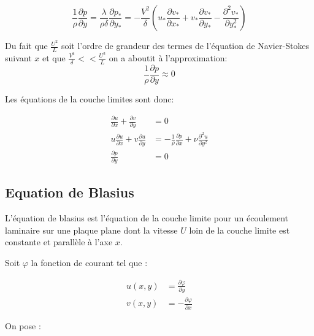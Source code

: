 \documentclass[french]{article}
\begin{document}
\begin{equation*}
	\frac{1}{\rho}
	\frac{\partial p}{\partial y} 
	= \frac{\lambda}{\rho\delta}
	\frac{\partial p_{*}}{\partial  y_{*}}
	= - \frac{V^{2}}{\delta}
	\left(
	u_{*}\frac{\partial v_{*}}{\partial x_{*}} + 
	v_{*}\frac{\partial v_{*}}{\partial y_{*}} 
	-\frac{\partial^{2} v_{*}}{\partial  y_{*}^{2}} 
	\right)
\end{equation*}

Du fait que $\frac{U^{2}}{L}$ soit l'ordre de grandeur des termes de l'équation de Navier-Stokes suivant $x$ et que $\frac{V^{2}}{\delta} << \frac{U^2}{L}$ on a aboutit à l'approximation:
\begin{equation*}
	\frac{1}{\rho}\frac{\partial p}{\partial y} \approx 0
\end{equation*}

Les équations de la couche limites sont donc:

\begin{align}	
	\frac{\partial u}{\partial x} 
	+
	\frac{\partial v}{\partial y} 
	&= 0 \\
	u\frac{\partial u}{\partial x} + 
	v\frac{\partial u}{\partial y} 
	&= - \frac{1}{\rho}
	\frac{\partial p}{\partial  x} +
	\nu
	\frac{\partial^{2} u}{\partial  y^{2}} \\
	\frac{\partial p}{\partial y} 
	&= 0
\end{align}
\subsection{Equation de Blasius}
L'équation de blasius est l'équation de la couche limite pour un écoulement laminaire sur une plaque plane dont la vitesse $U$ loin de la couche limite est constante et parallèle à l'axe $x$.

Soit $\varphi$ la fonction de courant tel que :

\begin{align*}
	u(x,y) &= 
	\frac{\partial \varphi}{\partial y} \\
	v(x,y) &= - 
	\frac{\partial \varphi}{\partial x}
\end{align*}

On pose :
\end{document}
